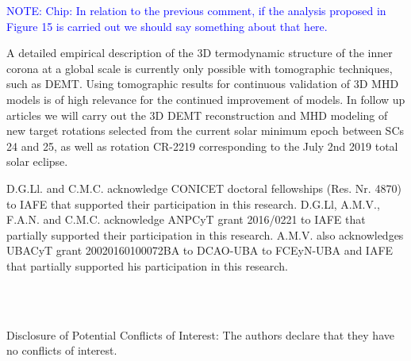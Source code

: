 \documentclass[namedreferences]{solarphysics}
\def\notebyalbert#1{\textcolor{blue}{NOTE: #1}}
\begin{document}
\begin{article}
\notebyalbert{Chip: In relation to the previous comment, if the analysis proposed in Figure 15 is carried out we should say something about that here.}

A detailed empirical description of the 3D termodynamic structure of the inner corona at a global scale is currently only possible with tomographic techniques, such as DEMT. Using tomographic results for continuous validation of 3D MHD models is of high relevance for the continued improvement of models. In {follow up articles} we will {carry out the 3D DEMT reconstruction and MHD modeling of} new target rotations {selected from} the current solar minimum {epoch} between SCs 24 and 25, {as well as rotation CR-2219 corresponding to the July 2nd 2019 total solar eclipse.}
\begin{acks}
D.G.Ll. and C.M.C. {acknowledge} CONICET doctoral {fellowships} (Res. Nr. 4870) to IAFE that supported {their} participation in this research. {D.G.Ll, A.M.V., F.A.N. and C.M.C. acknowledge ANPCyT grant 2016/0221 to IAFE that partially supported their participation in this research. A.M.V. also acknowledges UBACyT grant 20020160100072BA to DCAO-UBA to FCEyN-UBA and IAFE that partially supported his participation in this research.}
\end{acks}
\\
\\
\begin{footnotesize}
 Disclosure of Potential Conflicts of Interest: The authors declare that they have no conflicts of interest.
\end{footnotesize}

  

\end{article} 
\end{document}
